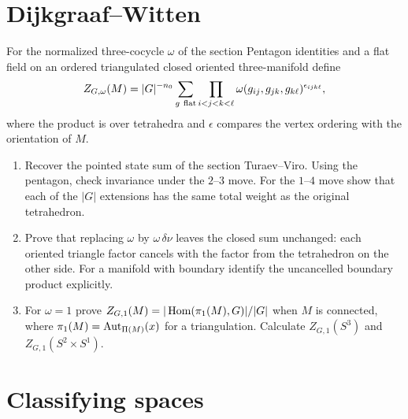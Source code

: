 \section{Dijkgraaf--Witten}

\begin{exercise}
For the normalized three-cocycle $\omega$ of the section Pentagon
identities and a flat field on an ordered triangulated closed
oriented three-manifold define
\[
 Z_{G,\omega}(M)=|G|^{-n_0}\sum_{g\ {\rm flat}}
 \prod_{i<j<k<\ell}
 \omega(g_{ij},g_{jk},g_{k\ell})^{\epsilon_{ijk\ell}},
\]
where the product is over tetrahedra and $\epsilon$ compares the
vertex ordering with the orientation of $M$.
\begin{enumerate}[label=(\alph*)]
\item Recover the pointed state sum of the section Turaev--Viro.
Using the pentagon, check invariance under the $2$--$3$ move.
For the $1$--$4$ move show that each of the $|G|$ extensions
has the same total weight as the original tetrahedron.
\item Prove that replacing $\omega$ by $\omega\,\delta\nu$
leaves the closed sum unchanged: each oriented triangle factor
cancels with the factor from the tetrahedron on the other side.
For a manifold with boundary identify the uncancelled boundary
product explicitly.
\item For $\omega=1$ prove
$Z_{G,1}(M)=|\operatorname{Hom}(\pi_1(M),G)|/|G|$ when $M$ is connected,
where $\pi_1(M)=\operatorname{Aut}_{\Pi(M)}(x)$ for a triangulation.
Calculate $Z_{G,1}(S^3)$ and $Z_{G,1}(S^2\times S^1)$.
\end{enumerate}
\end{exercise}

\section{Classifying spaces}

